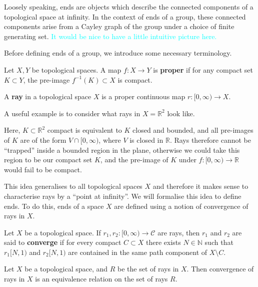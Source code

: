 Loosely speaking, ends are objects which describe the connected components of a topological space at infinity. In the context of ends of a group, these connected components arise from a Cayley graph of the group under a choice of finite generating set. \textcolor{cyan}{It would be nice to have a little intuitive picture here.} 

Before defining ends of a group, we introduce some necessary terminology.
\begin{definition}
    Let \(X, Y\) be topological spaces. A map \(f : X \to Y\) is \textbf{proper} if for any compact set \(K \subset Y\), the pre-image \(f^{-1}(K) \subset X\) is compact.
\end{definition}

\begin{definition}[Ray]
\label{ray}
    A \textbf{ray} in a topological space \(X\) is a proper continuous map \(r : [0,\infty) \to X\).
\end{definition}

\begin{example}
    A useful example is to consider what rays in \(X = \mathbb{R}^2\) look like. 

    Here, \(K \subset \mathbb{R}^2 \) compact is equivalent to \(K\) closed and bounded, and all pre-images of \(K\) are of the form \(V \cap [0,\infty)\), where \(V\) is closed in \(\mathbb{R}\). Rays therefore cannot be ``trapped'' inside a bounded region in the plane, otherwise we could take this region to be our compact set \(K\), and the pre-image of \(K\) under \(f:[0,\infty) \to \mathbb{R}\) would fail to be compact.
\end{example}

This idea generalises to all topological spaces \(X\) and therefore it makes sense to characterise rays by a ``point at infinity''. We will formalise this idea to define ends. To do this, ends of a space \(X\) are defined using a notion of convergence of rays in \(X\). 

\begin{definition} 
    Let \(X\) be a topological space. If \(r_1, r_2 : [0,\infty) \to \mathcal{C}\) are rays, then \(r_1\) and \(r_2\) are said to \textbf{converge} if for every compact \(C \subset X\) there exists \(N \in \mathbb{N}\) such that \(r_1[N,1)\) and \(r_2[N,1)\) are contained in the same path component of \(X \setminus C\).
\end{definition}

\begin{proposition}
    Let \(X\) be a topological space, and \(R\) be the set of rays in \(X\). Then convergence of rays in \(X\) is an equivalence relation on the set of rays \(R\).
\end{proposition}

